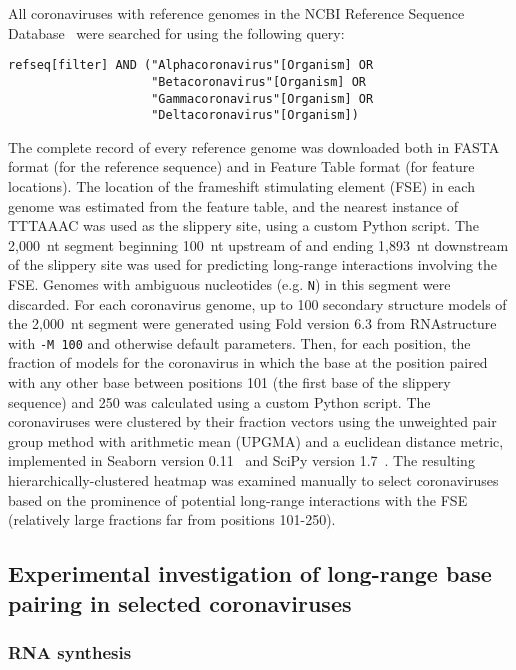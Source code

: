 \documentclass[main.tex]{subfiles}
\begin{document}
All coronaviruses with reference genomes in the NCBI Reference Sequence Database~\cite{OLeary2016} were searched for using the following query:
\begin{verbatim}
refseq[filter] AND ("Alphacoronavirus"[Organism] OR
                    "Betacoronavirus"[Organism] OR
                    "Gammacoronavirus"[Organism] OR
                    "Deltacoronavirus"[Organism])
\end{verbatim}
The complete record of every reference genome was downloaded both in FASTA format (for the reference sequence) and in Feature Table format (for feature locations).
The location of the frameshift stimulating element (FSE) in each genome was estimated from the feature table, and the nearest instance of TTTAAAC was used as the slippery site, using a custom Python script.
The 2,000~nt segment beginning 100~nt upstream of and ending 1,893~nt downstream of the slippery site was used for predicting long-range interactions involving the FSE.
Genomes with ambiguous nucleotides (e.g. \verb|N|) in this segment were discarded.
For each coronavirus genome, up to 100 secondary structure models of the 2,000~nt segment were generated using Fold version 6.3 from RNAstructure~\cite{Reuter2010} with \verb|-M 100| and otherwise default parameters.
Then, for each position, the fraction of models for the coronavirus in which the base at the position paired with any other base between positions 101 (the first base of the slippery sequence) and 250 was calculated using a custom Python script.
The coronaviruses were clustered by their fraction vectors using the unweighted pair group method with arithmetic mean (UPGMA) and a euclidean distance metric, implemented in Seaborn version 0.11~\cite{Waskom2021} and SciPy version 1.7~\cite{Virtanen2020}.
The resulting hierarchically-clustered heatmap was examined manually to select coronaviruses based on the prominence of potential long-range interactions with the FSE (relatively large fractions far from positions 101-250).


\subsection{Experimental investigation of long-range base pairing in selected coronaviruses}

\subsubsection{RNA synthesis}
\end{document}
